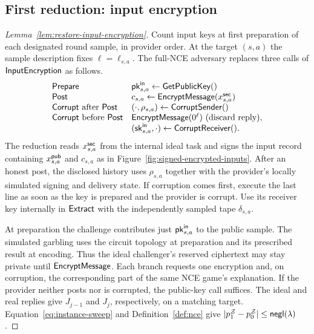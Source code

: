 \subsection{First reduction: input encryption}
\label{sec:first-hybrid-proof}
\begin{proof}[Lemma~\ref{lem:restore-input-encryption}]
Count input keys at first preparation of each designated round sample,
in provider order. At the target $(s,a)$ the sample description fixes
$\ell=\ell_{s,a}$. The full-NCE adversary replaces three calls of
$\mathsf{InputEncryption}$ as follows.
\[
 \begin{array}{@{}ll@{}}
  \Prepare & \inputpk_{s,a}\gets\GetPublicKey()\\
  \Post & c_{s,a}\gets\EncryptMessage(\xsec_{s,a})\\
  \Corrupt\text{ after }\Post &
     (\cdot,\rho_{s,a})\gets\CorruptSender()\\
  \Corrupt\text{ before }\Post &
     \EncryptMessage(0^\ell)\text{ (discard reply)},\\
     &(\inputsk_{s,a},\cdot)\gets\CorruptReceiver().
 \end{array}
\]
The reduction reads $x^{\mathsf{sec}}_{s,a}$ from the internal ideal task and
signs the input record containing $x^{\mathsf{pub}}_{s,a}$ and $c_{s,a}$ as in
Figure~\ref{fig:signed-encrypted-inputs}. After an honest post, the
disclosed history uses $\rho_{s,a}$ together with the provider's locally
simulated signing and delivery state.
If corruption comes first, execute the last line as soon as the key is
prepared and the provider is corrupt. Use its receiver key internally
in $\mathsf{Extract}$ with the independently sampled tape $\delta_{s,a}$.

At preparation the challenge contributes just $\mathsf{pk}^{\mathsf{in}}_{s,a}$ to the
public sample. The simulated garbling
uses the circuit topology at preparation and its prescribed result at
encoding. Thus the ideal challenger's reserved ciphertext may stay
private until $\mathsf{EncryptMessage}$. Each branch requests one encryption
and, on corruption, the corresponding part of the same NCE game's
explanation. If the provider neither posts nor is corrupted, the
public-key call suffices. The ideal and real replies give $J_{j-1}$ and
$J_j$, respectively, on a matching target. Equation~\eqref{eq:instance-sweep}
and Definition~\ref{def:nce} give
$|p_1^{\mathcal Z}-p_0^{\mathcal Z}|\leq\mathop{\mathsf{negl}}(\lambda)$.
\end{proof}

